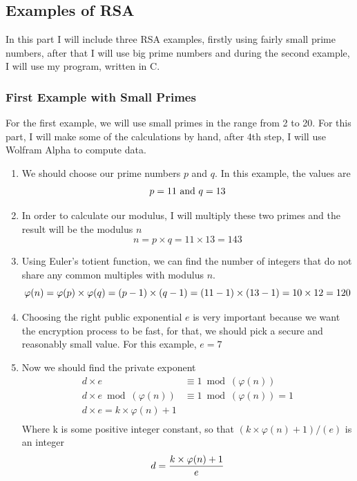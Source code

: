 \documentclass[a4paper, 12pt]{article}
\begin{document}
\subsection{Examples of RSA}
\label{bsec:example}

In this part I will include three RSA examples, firstly using fairly small prime numbers, after that
I will use big prime numbers and during the second example, I will use my program, written in C.

\subsubsection{First Example with Small Primes}
\label{bbsec:first}

For the first example, we will use small primes in the range from 2 to 20. For this part, I will make
some of the calculations by hand, after 4th step, I will use Wolfram Alpha to compute data.

\begin{enumerate}
\item We should choose our prime numbers $p$ and $q$. In this example, the values are
  \begin{equation*}
    p=11 \text{ and } q=13\\
  \end{equation*}
  \item In order to calculate our modulus, I will multiply these two primes and the result will be
    the modulus $n$
    \begin{equation*}
      n=p \times q=11 \times 13=143
    \end{equation*}
    \item Using Euler's totient function, we can find the number of integers that do not share any
      common multiples with modulus $n$.
      \begin{equation*}
        \varphi(n)=\varphi(p) \times \varphi(q)=(p-1) \times (q-1)=(11-1) \times (13-1)=10 \times 12=120\\
      \end{equation*}
      \item Choosing the right public exponential $e$ is very important because we want the encryption
process to be fast, for that, we should pick a secure and reasonably small value. For this
example, $e=7$

\item Now we should find the private exponent
  \begin{align*}
    d \times e &\equiv 1 \bmod(\varphi(n))\\
    d \times e \bmod(\varphi(n)) &\equiv 1 \bmod(\varphi(n)) =1\\
    d \times e = k \times \varphi(n) + 1\\
  \end{align*}
  Where k is some positive integer constant, so that $(k \times \varphi(n) + 1)/(e)$ is an integer
  \begin{equation*}
    d = \frac{k \times \varphi(n)+1}{e}\\
    \end{equation*}
\end{enumerate}
\end{document}
